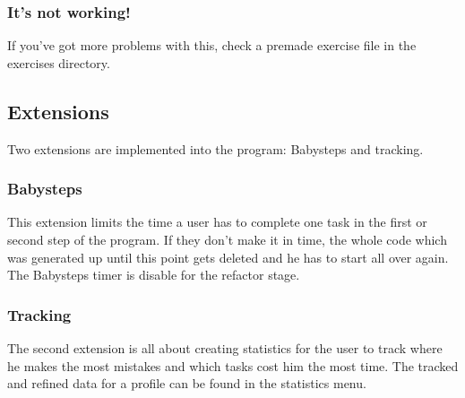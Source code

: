 \documentclass[10pt,a4paper]{article}
\begin{document}
\subsubsection{It's not working!}
If you've got more problems with this, check a premade exercise file in the exercises directory.

\subsection{Extensions}
Two extensions are implemented into the program: Babysteps and tracking.
\subsubsection{Babysteps}
This extension limits the time a user has to complete one task in the first or second step of the program. If they don't make it in time, the whole code which was generated up until this point gets deleted and he has to start all over again.
The Babysteps timer is disable for the refactor stage.
\subsubsection{Tracking}
The second extension is all about creating statistics for the user to track where he makes the most mistakes and which tasks cost him the most time. The tracked and refined data for a profile can be found in the statistics menu.
\end{document}
